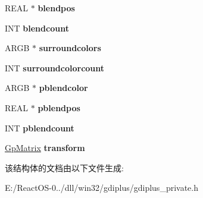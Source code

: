 \begin{DoxyCompactItemize}
R\+E\+AL $\ast$ {\bfseries blendpos}
\item 
\mbox{\label{struct_gp_path_gradient_a14e72fb258883d31fe04d83f3ebf12db}} 
I\+NT {\bfseries blendcount}
\item 
\mbox{\label{struct_gp_path_gradient_ad2d6cf74a37b46fea12a39da40485986}} 
A\+R\+GB $\ast$ {\bfseries surroundcolors}
\item 
\mbox{\label{struct_gp_path_gradient_a3ec0e98a05a65c1c9f2496ec15de6d98}} 
I\+NT {\bfseries surroundcolorcount}
\item 
\mbox{\label{struct_gp_path_gradient_ab67dc73e6cec6d383474856b89ed109e}} 
A\+R\+GB $\ast$ {\bfseries pblendcolor}
\item 
\mbox{\label{struct_gp_path_gradient_aa18c40aa2f1fed68b54c93e6e0949cce}} 
R\+E\+AL $\ast$ {\bfseries pblendpos}
\item 
\mbox{\label{struct_gp_path_gradient_a91b2cea85580b4b7b0ad2b245e35481e}} 
I\+NT {\bfseries pblendcount}
\item 
\mbox{\label{struct_gp_path_gradient_a3da85dee607f1e04490de5c3793706d4}} 
\hyperlink{struct_gp_matrix}{Gp\+Matrix} {\bfseries transform}
\end{DoxyCompactItemize}


该结构体的文档由以下文件生成\+:\begin{DoxyCompactItemize}
\item 
E\+:/\+React\+O\+S-\/0../dll/win32/gdiplus/gdiplus\+\_\+private.\+h\end{DoxyCompactItemize}
